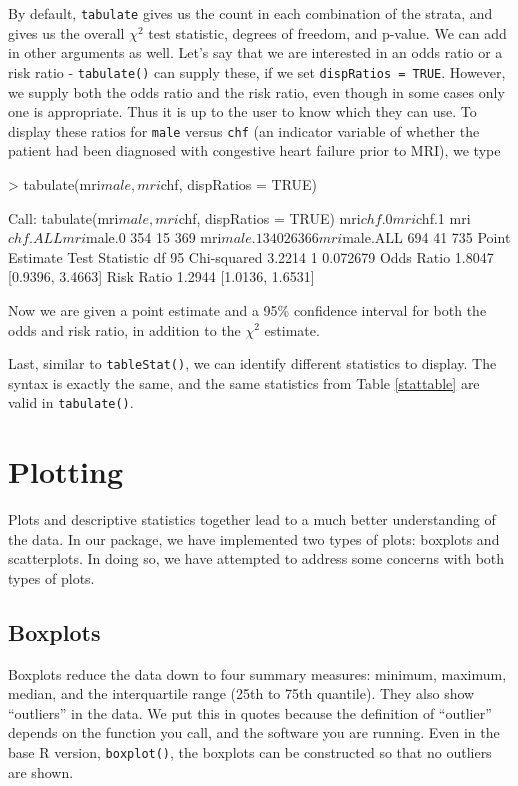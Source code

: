 \documentclass[landscape]{article}
\renewenvironment{Schunk}{\vspace{\topsep}}{\vspace{\topsep}}
\begin{document}
By default, \texttt{tabulate} gives us the count in each combination of the strata, and gives us the overall $\chi^2$ test statistic, degrees of freedom, and p-value. We can add in other arguments as well. Let's say that we are interested in an odds ratio or a risk ratio - \texttt{tabulate()} can supply these, if we set \texttt{dispRatios = TRUE}. However, we supply both the odds ratio and the risk ratio, even though in some cases only one is appropriate. Thus it is up to the user to know which they can use. To display these ratios for \texttt{male} versus \texttt{chf} (an indicator variable of whether the patient had been diagnosed with congestive heart failure prior to MRI), we type
\begin{Schunk}
\begin{Sinput}
> tabulate(mri$male, mri$chf, dispRatios = TRUE)
\end{Sinput}
\begin{Soutput}
Call:
tabulate(mri$male, mri$chf, dispRatios = TRUE)
             mri$chf.0 mri$chf.1 mri$chf.ALL
mri$male.0   354        15       369        
mri$male.1   340        26       366        
mri$male.ALL 694        41       735        
            Point Estimate Test Statistic df 95%
Chi-squared                3.2214         1                   0.072679         
Odds Ratio  1.8047                           [0.9396, 3.4663]                  
Risk Ratio  1.2944                           [1.0136, 1.6531]                  
\end{Soutput}
\end{Schunk}
Now we are given a point estimate and a 95\% confidence interval for both the odds and risk ratio, in addition to the $\chi^2$ estimate. 

Last, similar to \texttt{tableStat()}, we can identify different statistics to display. The syntax is exactly the same, and the same statistics from Table \ref{stattable} are valid in \texttt{tabulate()}.

\section{Plotting}
Plots and descriptive statistics together lead to a much better understanding of the data. In our package, we have implemented two types of plots: boxplots and scatterplots. In doing so, we have attempted to address some concerns with both types of plots.
\subsection{Boxplots}
Boxplots reduce the data down to four summary measures: minimum, maximum, median, and the interquartile range (25th to 75th quantile). They also show ``outliers'' in the data. We put this in quotes because the definition of ``outlier'' depends on the function you call, and the software you are running. Even in the base R version, \texttt{boxplot()}, the boxplots can be constructed so that no outliers are shown. 
\end{document}
